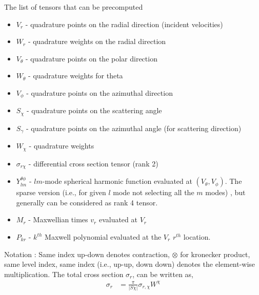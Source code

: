 \documentclass{article}[draft]
\begin{document}

The list of tensors that can be precomputed
\begin{itemize}
    \item $V_r$ - quadrature points on the radial direction (incident velocities)
    \item $W_r$ - quadrature weights on the radial direction
    \item $V_\theta$ - quadrature points on the polar direction 
    \item $W_\theta$ - quadrature weights for theta
    \item $V_\phi$ - quadrature points on the azimuthal direction 
    \item $S_\chi$ - quadrature points on the scattering angle
    \item $S_\gamma$ - quadrature points on the azimuthal angle (for scattering direction)
    \item $W_\chi$ - quadrature weights
    \item $\sigma_{r\chi}$ - differential cross section tensor (rank 2)
    \item $Y_{lm}^{\theta\phi}$ - $lm$-mode spherical harmonic function evaluated at $(V_\theta, V_\phi)$. The sparse version (i.e., for given $l$ mode not selecting all the $m$ modes) , but generally can be considered as rank 4 tensor. 
    \item $M_r$ - Maxwellian times $v_r$ evaluated at $V_r$
    \item $P_{kr}$     - $k^{th}$ Maxwell polynomial evaluated at the $V_r$ $r^{th}$ location.
\end{itemize}
Notation : Same index up-down denotes contraction, $\otimes$ for kronecker product, same level index, same index (i.e., up-up, down down) denotes the element-wise multiplication. 
The total cross section $\sigma_r$, can be written as, 
\begin{align}
    \sigma_r &= \frac{\pi}{|S\chi|} \sigma_{r,\chi} W^\chi
\end{align}
\end{document}

